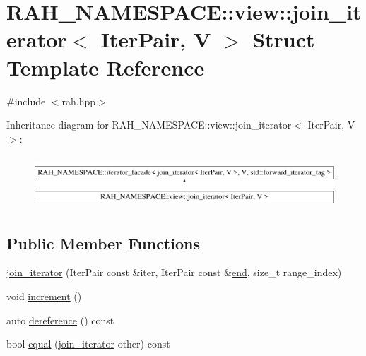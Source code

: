 \hypertarget{struct_r_a_h___n_a_m_e_s_p_a_c_e_1_1view_1_1join__iterator}{}\section{R\+A\+H\+\_\+\+N\+A\+M\+E\+S\+P\+A\+CE\+::view\+::join\+\_\+iterator$<$ Iter\+Pair, V $>$ Struct Template Reference}
\label{struct_r_a_h___n_a_m_e_s_p_a_c_e_1_1view_1_1join__iterator}


{\ttfamily \#include $<$rah.\+hpp$>$}

Inheritance diagram for R\+A\+H\+\_\+\+N\+A\+M\+E\+S\+P\+A\+CE\+::view\+::join\+\_\+iterator$<$ Iter\+Pair, V $>$\+:\begin{figure}[H]
\begin{center}
\leavevmode
\includegraphics[height=1.992882cm]{struct_r_a_h___n_a_m_e_s_p_a_c_e_1_1view_1_1join__iterator}
\end{center}
\end{figure}
\subsection*{Public Member Functions}
\begin{DoxyCompactItemize}
\item 
\mbox{\hyperlink{struct_r_a_h___n_a_m_e_s_p_a_c_e_1_1view_1_1join__iterator_a9667543cbe60443640165c2b0f40e930}{join\+\_\+iterator}} (Iter\+Pair const \&iter, Iter\+Pair const \&\mbox{\hyperlink{namespace_r_a_h___n_a_m_e_s_p_a_c_e_ad5f90a809a5221569377c400175a20bf}{end}}, size\+\_\+t range\+\_\+index)
\item 
void \mbox{\hyperlink{struct_r_a_h___n_a_m_e_s_p_a_c_e_1_1view_1_1join__iterator_abcb804717c1e8b2a5fe83dba8f757d28}{increment}} ()
\item 
auto \mbox{\hyperlink{struct_r_a_h___n_a_m_e_s_p_a_c_e_1_1view_1_1join__iterator_a767b00208ccd127dc728c35defc526f0}{dereference}} () const
\item 
bool \mbox{\hyperlink{struct_r_a_h___n_a_m_e_s_p_a_c_e_1_1view_1_1join__iterator_a92db3de2df175d2514d72b2ea027c930}{equal}} (\mbox{\hyperlink{struct_r_a_h___n_a_m_e_s_p_a_c_e_1_1view_1_1join__iterator}{join\+\_\+iterator}} other) const
\end{DoxyCompactItemize}
